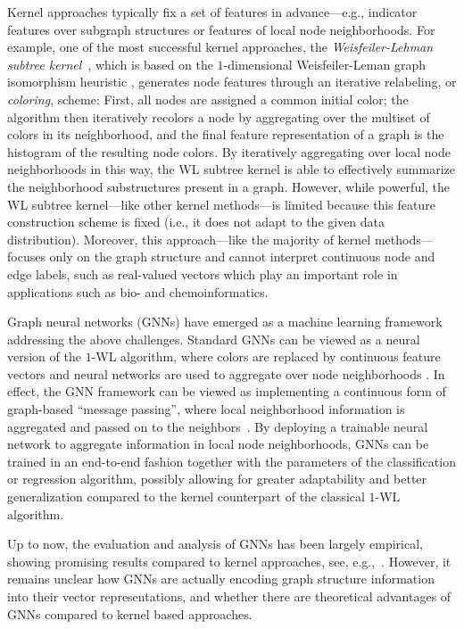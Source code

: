 \documentclass[letterpaper]{article}
\theoremstyle{definition}
\newcommand{\new}[1]{\emph{#1}}
\begin{document}
Kernel approaches typically fix a set of features in advance---e.g., indicator features over subgraph structures or features of local node neighborhoods.
For example, one of the most successful kernel approaches, the \new{Weisfeiler-Lehman subtree kernel}~\cite{She+2011}, which is based on the $1$-dimensional Weisfeiler-Leman graph isomorphism heuristic \cite[pp.\,79\,ff.]{Gro2017}, generates node features through an iterative relabeling, or \emph{coloring}, scheme: 
First, all nodes are assigned a common initial color; the algorithm then iteratively recolors a node by aggregating over the multiset of colors in its neighborhood, and the final feature representation of a graph is the histogram of the resulting node colors.  
By iteratively aggregating over local node neighborhoods in this way, the WL subtree kernel is able to effectively summarize the neighborhood substructures present in a graph. 
However, while powerful, the WL subtree kernel---like other kernel methods---is limited because this feature construction scheme is fixed (i.e., it does not adapt to the given data distribution). Moreover, this approach---like the majority of kernel methods---focuses only on the graph structure and cannot interpret continuous node and edge labels, such as real-valued vectors which play an important role in applications such as bio- and chemoinformatics. 
 
Graph neural networks (GNNs) have emerged as a machine learning framework addressing the above challenges.
Standard GNNs can be viewed as a neural version of the $1$-WL algorithm, where colors are replaced by continuous feature vectors and neural networks are used to aggregate over node neighborhoods \cite{Ham+2017,Kip+2017}. 
In effect, the GNN framework can be viewed as implementing a continuous form of graph-based ``message passing'', where local neighborhood information is aggregated and passed on to the neighbors~\cite{Gil+2017}. By deploying a trainable neural network to aggregate information in local node neighborhoods, GNNs can be trained in an end-to-end fashion together with the parameters of the classification or regression algorithm, possibly allowing for greater adaptability and better generalization 
compared to the kernel counterpart of the classical $1$-WL algorithm. 

Up to now, the evaluation and analysis of GNNs has been largely empirical, showing promising results compared to kernel approaches, see, e.g.,~\cite{Yin+2018}. However, it remains unclear how GNNs are actually encoding graph structure information into their vector representations, and whether there are theoretical advantages of GNNs compared to kernel based approaches. 
\end{document}
